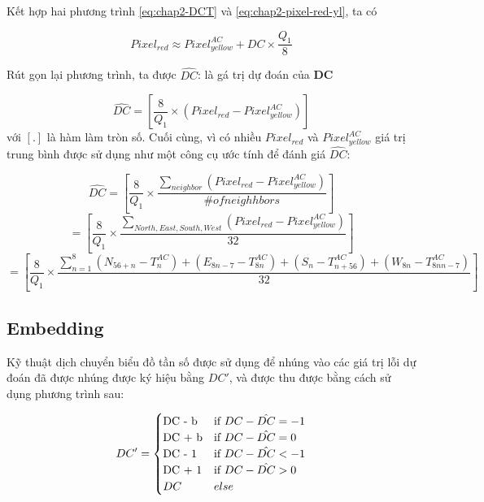 Kết hợp hai phương trình \ref{eq:chap2-DCT} và \ref{eq:chap2-pixel-red-yl}, ta có

\begin{equation}
\label{eq:apprro_pixel}
Pixel_{red} \approx Pixel_{yellow}^{AC} + DC \times \frac{Q_1}{8}
\end{equation}

Rút gọn lại phương trình, ta được \textbf{$\hat{DC}$}: là gá trị dự đoán của \textbf{DC}

\begin{equation}
\label{eq:appro_pixel_compact}
\textbf{$\hat{DC}$} = [\frac{8}{Q_1} \times (Pixel_{red} - Pixel_{yellow}^{AC}) ]
\end{equation}
với $[.]$ là hàm làm tròn số. Cuối cùng, vì có nhiều $Pixel_{red}$ và $Pixel_{yellow}^{AC}$ giá trị trung bình được sử dụng như một công cụ ước tính để đánh giá \textbf{$\hat{DC}$}:

\begin{equation}
\label{eq:DC_evaluation_1}
\textbf{$\hat{DC}$} = [\frac{8}{Q_1} \times \frac{\sum_{neighbor}(Pixel_{red} - Pixel_{yellow}^{AC})}{\# of neighhbors} ]
\end{equation}
\begin{equation}
\label{eq:DC_evaluation_2}
 = [\frac{8}{Q_1} \times \frac{\sum_{North, East, South, West}(Pixel_{red} - Pixel_{yellow}^{AC})}{32} ]
\end{equation}
\begin{equation}
\label{eq:DC_evaluation_3}
 = [\frac{8}{Q_1} \times \frac{\sum_{n=1}^8 (N_{56+n} - T_n^{AC}) + (E_{8n-7} - T_{8n}^{AC}) + (S_n - T_{n+56}^{AC}) + (W_{8n} - T_{8nn-7}^{AC})}{32} ]
\end{equation}


\subsection{Embedding}
Kỹ thuật dịch chuyển biểu đồ tần số được sử dụng để nhúng vào các giá trị lỗi dự đoán đã được nhúng được ký hiệu bằng $DC'$, và được thu được bằng cách sử dụng phương trình sau: 

\begin{equation}
\label{eq:DC_embeded}
DC'= \begin{cases}
$DC - b$ & $if  $  DC - \hat{DC} = - 1 \\
$DC + b$ & $if  $  DC - \hat{DC} = 0 \\
$DC - 1$ & $if  $  DC - \hat{DC} < -1 \\
$DC + 1$ & $if  $  DC - \hat{DC} > 0 \\
DC  & else
\end{cases}
\end{equation}

